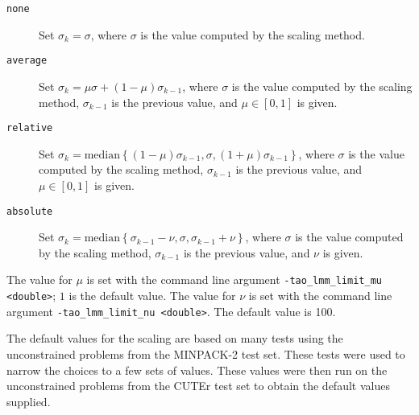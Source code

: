 \begin{description}
\item[{\tt none}] Set $\sigma_k = \sigma$, where $\sigma$ is the value
computed by the scaling method.
\item[{\tt average}] Set $\sigma_k = \mu \sigma + (1 - \mu) \sigma_{k-1}$, 
where $\sigma$ is the value computed by the scaling method, $\sigma_{k-1}$ is
the previous value, and $\mu \in [0,1]$ is given.
\item[{\tt relative}] Set $\sigma_k = \mbox{median}\left\{ (1 - \mu) \sigma_{k-1}, \sigma, (1+\mu) \sigma_{k-1}\right\}$, 
where $\sigma$ is the value computed by the scaling method, $\sigma_{k-1}$ is 
the previous value, and $\mu \in [0,1]$ is given.
\item[{\tt absolute}] Set $\sigma_k = \mbox{median}\left\{\sigma_{k-1} - \nu, \sigma, \sigma_{k-1} + \nu\right\}$, 
where $\sigma$ is the value computed by the scaling method, $\sigma_{k-1}$ is 
the previous value, and $\nu$ is given.
\end{description}
The value for $\mu$ is set with the command line argument 
{\tt -tao\_lmm\_limit\_mu <double>}; $1$ is the default value.
The value for $\nu$ is set with the command line argument 
{\tt -tao\_lmm\_limit\_nu <double>}.  The default value is 100.  

The default values for the scaling are based on many tests using the
unconstrained problems from the MINPACK-2 test set.  These tests were
used to narrow the choices to a few sets of values.  These values were
then run on the unconstrained problems from the CUTEr test set to
obtain the default values supplied.

